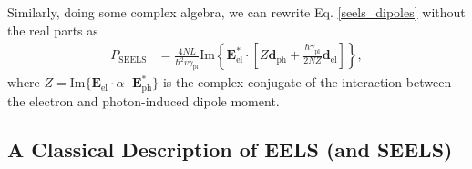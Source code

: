 \documentclass [11pt, proquest] {uwthesis}[2016/11/22]
\begin{document}
Similarly, doing some complex algebra, we can rewrite Eq. \ref{seels_dipoles} without the real parts as
\begin{equation}
\begin{aligned}
P_{\textrm{SEELS}} &= \frac{4NL}{\hbar^2 v \gamma_{\textrm{pl}}}\textrm{Im}\left\{\textbf{E}_{\textrm{el}}^*\cdot\left[Z\textbf{d}_{\textrm{ph}} + \frac{\hbar\gamma_{\textrm{pl}}}{2NZ}\textbf{d}_{\textrm{el}}\right]\right\},
  \label{seels_dipoles_imag}
\end{aligned}
\end{equation}
where $Z=\textrm{Im}\{\textbf{E}_{\textrm{el}}\cdot\alpha\cdot\textbf{E}_{\textrm{ph}}^*\}$ is the complex conjugate of the interaction between the electron and photon-induced dipole moment.

\subsection{A Classical Description of EELS (and SEELS)}
\end{document}
